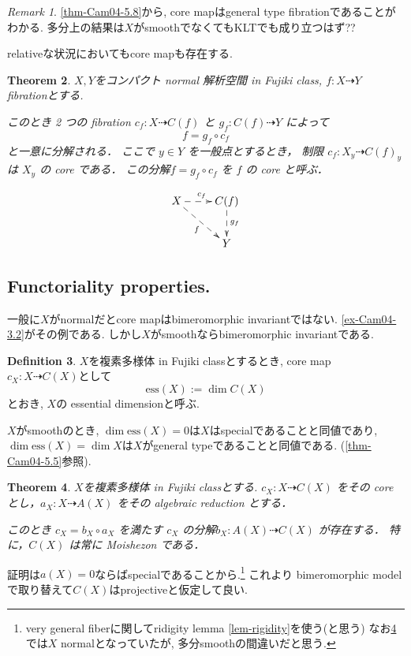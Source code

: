 \documentclass[dvipdfmx,a4paper,11pt]{article} %
\newtheorem{thm}{Theorem}[section]
\theoremstyle{definition}
\newtheorem{defn}[thm]{Definition}
\theoremstyle{remark}
\newtheorem{rem}[thm]{Remark}
\numberwithin{equation}{section}
\begin{document}
\begin{rem}\cite[Remark 3.4]{Cam04}
\ref{thm-Cam04-5.8}から, core mapはgeneral type fibrationであることがわかる. 
多分上の結果は$X$がsmoothでなくてもKLTでも成り立つはず??
\end{rem}


relativeな状況においてもcore mapも存在する. 

\begin{thm}\cite[Theorem 3.8]{Cam04}
$X, Y$をコンパクト normal 解析空間 in Fujiki class, 
\(f : X\dashrightarrow Y\) fibrationとする.
 
このとき 2 つの fibration \(c_f : X\dashrightarrow C(f)\) と \(g_f : C(f)\dashrightarrow Y\) によって
\[
f=g_f\circ c_f
\]
と一意に分解される．
ここで \(y\in Y\) を一般点とするとき， 制限 \(c_f : X_y\dashrightarrow C(f)_y\) は \(X_y\) の core である．
この分解\(f=g_f\circ c_f\) を \(f\) の core と呼ぶ．

\[
\xymatrix{
X\ar@{-->}[rd]_{f} \ar@{-->}[r]^{c_f} & C(f)  \ar@{-->}[d]^{g_f} \\
& Y
}
\]

\end{thm}


\subsection{Functoriality properties. \cite[3.2]{Cam04}}

一般に$X$がnormalだとcore mapはbimeromorphic invariantではない. 
\ref{ex-Cam04-3.2}がその例である. 
しかし$X$がsmoothならbimeromorphic invariantである.
\begin{defn}
$X$を複素多様体 in Fujiki classとするとき, 
core map $c_X : X \dashrightarrow C(X)$として
$$
\mathrm{ess}(X) := \dim C(X)
$$
とおき, $X$の essential dimensionと呼ぶ. 
\end{defn}
$X$がsmoothのとき, 
$\dim \mathrm{ess}(X)=0$は$X$はspecialであることと同値であり, $\dim \mathrm{ess}(X)=\dim X$は$X$がgeneral typeであることと同値である. (\ref{thm-Cam04-5.5}参照).


\begin{thm}\cite[Theorem 3.9]{Cam04}
\label{thm-Cam04-3.9}
$X$を複素多様体 in Fujiki classとする. 
\(c_X : X\dashrightarrow C(X)\) をその core とし，\(a_X : X\dashrightarrow A(X)\) をその algebraic reduction とする． 

このとき \(c_X=b_X\circ a_X\) を満たす \(c_X\) の分解\(b_X : A(X)\dashrightarrow C(X)\) が存在する．
特に，\(C(X)\) は常に Moishezon である．
\end{thm}
証明は$a(X)=0$ならばspecialであることから.\footnote{very general fiberに関してridigity lemma \ref{lem-rigidity}を使う(と思う) なお\ref{thm-Cam04-3.9}では$X$ normalとなっていたが, 多分smoothの間違いだと思う.}
これより bimeromorphic modelで取り替えて$C(X)$はprojectiveと仮定して良い. 
\end{document}
